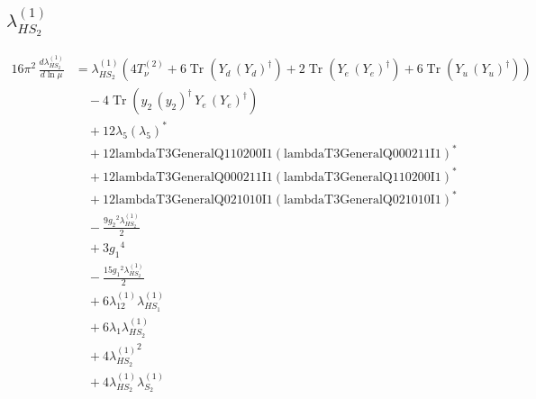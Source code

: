 \documentclass[10pt,a4paper]{article}
\begin{document}
\subsection*{$\lambda_{HS_2}^{(1)}$}
\begin{align*}
16\pi^2\,\frac{d \lambda_{HS_2}^{(1)}}{d\ln\mu} &={\lambda_{HS_2}^{(1)}} (4 T_{\nu}^{(2)}+6 \operatorname{Tr}\!\left({Y_d}\,\left({Y_d}\right)^{\dagger}\right)+2 \operatorname{Tr}\!\left({Y_e}\,\left({Y_e}\right)^{\dagger}\right)+6 \operatorname{Tr}\!\left({Y_u}\,\left({Y_u}\right)^{\dagger}\right)) \\
&\quad -4 \operatorname{Tr}\!\left({y_2}\,\left({y_2}\right)^{\dagger}\,{Y_e}\,\left({Y_e}\right)^{\dagger}\right) \\
&\quad +12 {\lambda_5} \left({\lambda_5}\right)^{*} \\
&\quad +12 \text{lambdaT3GeneralQ110200I1} \left(\text{lambdaT3GeneralQ000211I1}\right)^{*} \\
&\quad +12 \text{lambdaT3GeneralQ000211I1} \left(\text{lambdaT3GeneralQ110200I1}\right)^{*} \\
&\quad +12 \text{lambdaT3GeneralQ021010I1} \left(\text{lambdaT3GeneralQ021010I1}\right)^{*} \\
&\quad -\frac{9 {g_2}^2 {\lambda_{HS_2}^{(1)}}}{2} \\
&\quad +3 {g_1}^4 \\
&\quad -\frac{15 {g_1}^2 {\lambda_{HS_2}^{(1)}}}{2} \\
&\quad +6 {\lambda_{12}^{(1)}} {\lambda_{HS_1}^{(1)}} \\
&\quad +6 {\lambda_1} {\lambda_{HS_2}^{(1)}} \\
&\quad +4 {\lambda_{HS_2}^{(1)}}^2 \\
&\quad +4 {\lambda_{HS_2}^{(1)}} {\lambda_{S_2}^{(1)}} \\
\end{align*}
\end{document}
